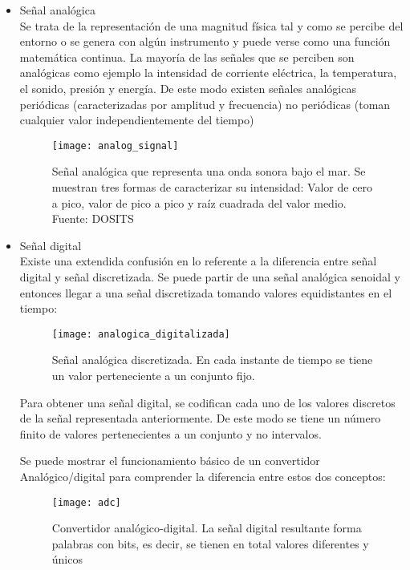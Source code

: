 \begin{itemize}
\item Señal analógica
\\
Se trata de la representación de una magnitud física tal y como se percibe del entorno o se genera con algún instrumento y puede verse como una función matemática continua.
La mayoría de las señales que se perciben son analógicas como ejemplo la intensidad de corriente eléctrica, la temperatura, el sonido, presión y energía.
De este modo existen señales analógicas periódicas (caracterizadas por amplitud y frecuencia) no periódicas (toman cualquier valor independientemente del tiempo)

\begin{figure}[!htb]
\centering
{}
  \texttt{[image: analog\_signal]}
  \caption{Señal analógica que representa una onda sonora bajo el mar. Se muestran tres formas de caracterizar su intensidad: Valor de cero a pico, valor de pico a pico y raíz cuadrada del valor medio. Fuente: DOSITS}\label{fig:analog_signal}
  
\endminipage\hfill
\end{figure}

\item Señal digital
\\
Existe una extendida confusión en lo referente a la diferencia entre señal digital y señal discretizada. Se puede partir de una señal analógica senoidal y entonces llegar a una señal discretizada tomando valores equidistantes en el tiempo:
\begin{figure}[!htb]
\centering
{}
  \texttt{[image: analogica\_digitalizada]}
  \caption{Señal analógica discretizada. En cada instante de tiempo se tiene un valor perteneciente a un conjunto fijo.}\label{fig:analogica_digitalizada}
\endminipage\hfill
\end{figure}

Para obtener una señal digital, se codifican cada uno de los valores discretos de la señal representada anteriormente. De este modo se tiene un número finito de valores pertenecientes a un conjunto y no intervalos.

Se puede mostrar el funcionamiento básico de un convertidor Analógico/digital para comprender la diferencia entre estos dos conceptos:

\begin{figure}[!htb]
\centering
{}
  \texttt{[image: adc]}
  \caption{Convertidor analógico-digital. La señal digital resultante forma palabras con  bits, es decir, se tienen en total   valores diferentes y únicos}\label{fig:adc}
\endminipage\hfill
\end{figure}


\end{itemize}
